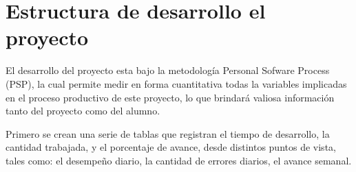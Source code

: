 \documentclass[a4paper,12pt,openany,oneside]{book}
\begin{document}

\section{Estructura de desarrollo el proyecto}
El desarrollo del proyecto esta bajo la metodología Personal Sofware Process (PSP), la cual permite medir en forma cuantitativa todas la variables implicadas en el proceso productivo de este proyecto, lo que brindará valiosa información tanto del proyecto como del alumno.

Primero se crean una serie de tablas que registran el tiempo de desarrollo, la cantidad trabajada, y el porcentaje de avance, desde distintos puntos de vista, tales como: el desempeño diario, la cantidad de errores diarios, el avance semanal.
\end{document}
